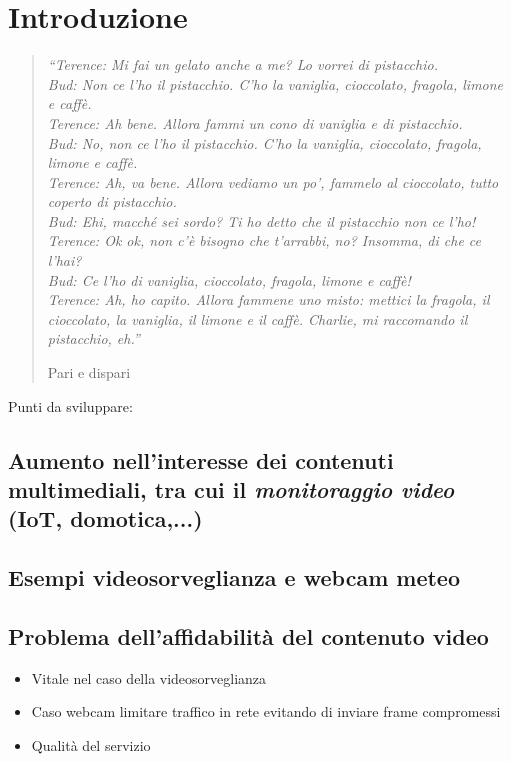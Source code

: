 \chapter{Introduzione}
\label{Introduzione}
\thispagestyle{empty}

\begin{quotation}
	{\footnotesize
		\noindent\emph{``Terence: Mi fai un gelato anche a me? Lo vorrei di pistacchio. \\
			Bud: Non ce l'ho il pistacchio. C'ho la vaniglia, cioccolato, fragola, limone e caff\`e. \\
			Terence: Ah bene. Allora fammi un cono di vaniglia e di pistacchio. \\
			Bud: No, non ce l'ho il pistacchio. C'ho la vaniglia, cioccolato, fragola, limone e caff\`e. \\
			Terence: Ah, va bene. Allora vediamo un po', fammelo al cioccolato, tutto coperto di pistacchio. \\
			Bud: Ehi, macch\'e sei sordo? Ti ho detto che il pistacchio non ce l'ho! \\
			Terence: Ok ok, non c'\`e bisogno che t'arrabbi, no? Insomma, di che ce l'hai? \\
			Bud: Ce l'ho di vaniglia, cioccolato, fragola, limone e caff\`e! \\
			Terence: Ah, ho capito. Allora fammene uno misto: mettici la fragola, il cioccolato, la vaniglia, il limone e il caff\`e. Charlie, mi raccomando il pistacchio, eh.''}
		\begin{flushright}
			Pari e dispari
		\end{flushright}
	}
\end{quotation}
\vspace{0.5cm}
Punti da sviluppare:

\section{Aumento nell'interesse dei contenuti multimediali, tra cui il \textit{monitoraggio video} (IoT, domotica,...)}
\section{Esempi videosorveglianza e webcam meteo}
\section{Problema dell'affidabilit\`a del contenuto video}
\begin{itemize}
	\item Vitale nel caso della videosorveglianza
	\item Caso webcam limitare traffico in rete evitando di inviare frame compromessi
	\item Qualit\`a del servizio
\end{itemize}
